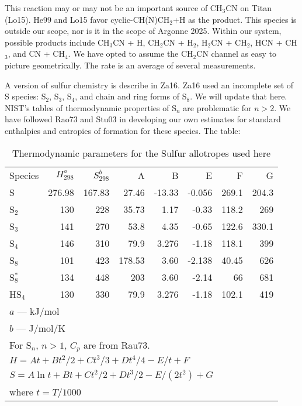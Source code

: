 \documentclass[12pt,landscape]{article}
\newcounter{reaction}
\begin{document}
  This reaction may or may not be an important source of CH$_3$CN on Titan (Lo15).
He99 and Lo15 favor cyclic-CH(N)CH$_2$+H as the product.  This species is outside our scope, nor is it in the scope of Argonne 2025.
Within our system, possible products include CH$_3$CN + H, CH$_2$CN + H$_2$,  H$_2$CN + CH$_2$, HCN + CH$_3$, and CN + CH$_4$.
We have opted to assume the CH$_2$CN channel as easy to picture geometrically.
The rate is an average of several measurements.

\noindent A version of sulfur chemistry is describe in Za16.  Za16 used an incomplete set of S species: S$_2$, S$_3$, S$_4$, and chain and ring forms of S$_8$.
We will update that here.
NIST's tables of thermodynamic properties of S$_n$ are problematic for $n>2$.  
We have followed Rao73 and Stu03 in developing our own estimates for standard enthalpies and entropies of formation for these species.
The table:
\begin{table}[h]
\caption{Thermodynamic parameters for the Sulfur allotropes used here}
\begin{tabular}{l r r r r r r r}
\hline
Species  & $H^a_{298}$ & $S^b_{298}$ & A & B & E & F & G \\
S      & 276.98 & 167.83 & 27.46 & -13.33 & -0.056 & 269.1 & 204.3  \\
S$_2$  & 130 & 228 & 35.73 & 1.17 & -0.33 & 118.2 & 269  \\
S$_3$  & 141 & 270 & 53.8 & 4.35 & -0.65 & 122.6 & 330.1  \\
S$_4$  & 146 & 310 & 79.9 & 3.276  &  -1.18 & 118.1 & 399  \\
S$_8$  & 101 & 423 & 178.53 & 3.60 & -2.138 & 40.45  & 626  \\
S$_8^{\ast}$  & 134 & 448 & 203 & 3.60   & -2.14 & 66  & 681\\
HS$_4$  & 130 & 330 & 79.9 & 3.276  &  -1.18 & 102.1 & 419\\
\hline
\multicolumn{8}{l}{$a$ --- kJ/mol}\\
\multicolumn{8}{l}{$b$ --- J/mol/K}\\
\multicolumn{8}{l}{For S$_n$, $n>1$, $C_p$ are from Rau73. }\\
\multicolumn{8}{l}{$H = At + Bt^2/2 + Ct^3/3 + D t^4/4 - E/t + F$}\\
\multicolumn{8}{l}{$S = A\ln{t} + Bt + Ct^2/2 + Dt^3/2 - E/(2t^2) + G$}\\
\multicolumn{8}{l}{where $t=T/1000$ }\\
 \end{tabular}
\label{table:two}
\end{table}
\end{document}
